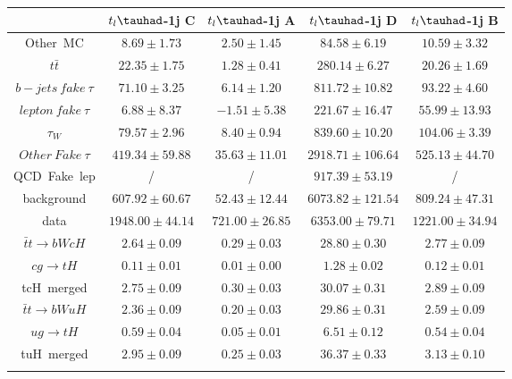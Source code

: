 \centering
\begin{tabular}{ccccc} \toprule\toprule
 & $t_{l}\tauhad$-1j C & $t_{l}\tauhad$-1j A & $t_{l}\tauhad$-1j D & $t_{l}\tauhad$-1j B\\\midrule
Other~MC & $8.69\pm1.73$ & $2.50\pm1.45$ & $84.58\pm6.19$ & $10.59\pm3.32$\\
$t\bar{t}$ & $22.35\pm1.75$ & $1.28\pm0.41$ & $280.14\pm6.27$ & $20.26\pm1.69$\\
$b-jets~fake~\tau$ & $71.10\pm3.25$ & $6.14\pm1.20$ & $811.72\pm10.82$ & $93.22\pm4.60$\\
$lepton~fake~\tau$ & $6.88\pm8.37$ & $-1.51\pm5.38$ & $221.67\pm16.47$ & $55.99\pm13.93$\\
$\tau_{W}$ & $79.57\pm2.96$ & $8.40\pm0.94$ & $839.60\pm10.20$ & $104.06\pm3.39$\\
$Other~Fake~\tau$ & $419.34\pm59.88$ & $35.63\pm11.01$ & $2918.71\pm106.64$ & $525.13\pm44.70$\\
QCD~Fake~lep &  / &  / & $917.39\pm53.19$ &  /\\
background & $607.92\pm60.67$ & $52.43\pm12.44$ & $6073.82\pm121.54$ & $809.24\pm47.31$\\
data & $1948.00\pm44.14$ & $721.00\pm26.85$ & $6353.00\pm79.71$ & $1221.00\pm34.94$\\
$\bar{t}t\to bWcH$ & $2.64\pm0.09$ & $0.29\pm0.03$ & $28.80\pm0.30$ & $2.77\pm0.09$\\
$cg\to tH$ & $0.11\pm0.01$ & $0.01\pm0.00$ & $1.28\pm0.02$ & $0.12\pm0.01$\\
tcH~merged & $2.75\pm0.09$ & $0.30\pm0.03$ & $30.07\pm0.31$ & $2.89\pm0.09$\\
$\bar{t}t\to bWuH$ & $2.36\pm0.09$ & $0.20\pm0.03$ & $29.86\pm0.31$ & $2.59\pm0.09$\\
$ug\to tH$ & $0.59\pm0.04$ & $0.05\pm0.01$ & $6.51\pm0.12$ & $0.54\pm0.04$\\
tuH~merged & $2.95\pm0.09$ & $0.25\pm0.03$ & $36.37\pm0.33$ & $3.13\pm0.10$\\
\bottomrule\bottomrule\\
\end{tabular}
